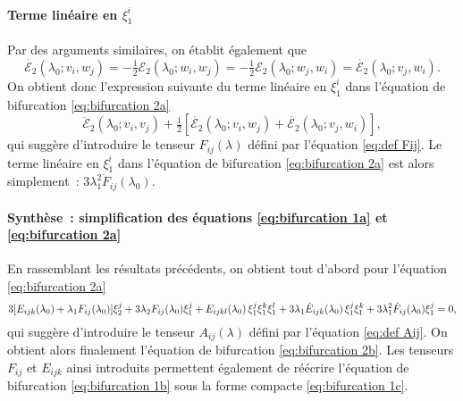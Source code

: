 \documentclass{article}
\begin{document}
\paragraph{Terme linéaire en $\xi_1^i$}Par des arguments similaires, on
établit également que
\[ \dot{\mathcal{E}_2} (\lambda_0 ; v_i, w_j) = - \tfrac{1}{2} \mathcal{E}_2
   (\lambda_0 ; w_i, w_j) = - \tfrac{1}{2} \mathcal{E}_2 (\lambda_0 ; w_j,
   w_i) = \dot{\mathcal{E}_2} (\lambda_0 ; v_j, w_i) . \]
On obtient donc l'expression suivante du terme linéaire en $\xi_1^i$ dans
l'équation de bifurcation \eqref{eq:bifurcation 2a}
\[ \ddot{\mathcal{E}}_2 (\lambda_0 ; v_i, v_j) + \tfrac{1}{2}
   [\dot{\mathcal{E}_2} (\lambda_0 ; v_i, w_j) + \dot{\mathcal{E}_2}
   (\lambda_0 ; v_j, w_i)], \]
qui suggère d'introduire le tenseur $F_{i  j} (\lambda)$
défini par l'équation \eqref{eq:def Fij}. Le terme linéaire en
$\xi_1^i$ dans l'équation de bifurcation \eqref{eq:bifurcation 2a} est
alors simplement~: $3 \lambda_1^2  \dot{F}_{i  j} (\lambda_0)$.

\paragraph{Synthèse~: simplification des équations
\eqref{eq:bifurcation 1a} et \eqref{eq:bifurcation 2a}}En rassemblant les
résultats précédents, on obtient tout d'abord pour l'équation
\eqref{eq:bifurcation 2a}
\[ 3 [E_{i  j  k} (\lambda_0) + \lambda_1 F_{i  j}
   (\lambda_0)] \xi_2^j + 3 \lambda_2 F_{i  j} (\lambda_0) \xi_1^j +
   E_{i  j  k  l} (\lambda_0)  \hspace{0.17em} \xi_1^j
   \xi_1^k \xi_1^l + 3 \lambda_1  \dot{E}_{i  j  k}
   (\lambda_0)  \hspace{0.17em} \xi_1^j \xi_1^k + 3 \lambda_1^2  \dot{F}_{i
    j} (\lambda_0) \xi_1^j = 0, \]
qui suggère d'introduire le tenseur $A_{i  j} (\lambda)$
défini par l'équation \eqref{eq:def Aij}. On obtient alors finalement
l'équation de bifurcation \eqref{eq:bifurcation 2b}. Les tenseurs $F_{i
 j}$ et $E_{i  j  k}$ ainsi introduits permettent
également de réécrire l'équation de bifurcation
\eqref{eq:bifurcation 1b} sous la forme compacte \eqref{eq:bifurcation 1c}.
\end{document}
